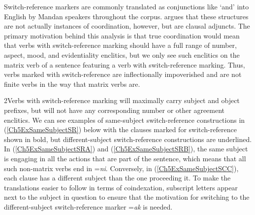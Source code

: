 Switch-reference markers are commonly translated as conjunctions like `and' into English by Mandan speakers throughout the corpus. \citet{kasak2019} argues that these structures are not actually instances of coordination, however, but are clausal adjuncts. The primary motivation behind this analysis is that true coordination would mean that verbs with switch-reference marking should have a full range of number, aspect, mood, and evidentiality enclitics, but we only see such enclitics on the matrix verb of a sentence featuring a verb with switch-reference marking. Thus, verbs marked with switch-reference are inflectionally impoverished and are not finite verbs in the way that matrix verbs are. 

2Verbs with switch-reference marking will maximally carry subject and object prefixes, but will not have any corresponding number or other agreement enclitics. We can see examples of same-subject switch-reference constructions in (\ref{Ch5ExSameSubjectSR}) below with the clauses marked for switch-reference shown in bold, but different-subject switch-reference constructions are underlined. In (\ref{Ch5ExSameSubjectSRA}) and (\ref{Ch5ExSameSubjectSRB}), the same subject is engaging in all the actions that are part of the sentence, which means that all such non-matrix verbs end in =\textit{ni}. Conversely, in (\ref{Ch5ExSameSubjectSCC}), each clause has a different subject than the one proceeding it. To make the translations easier to follow in terms of coindexation, subscript letters appear next to the subject in question to ensure that the motivation for switching to the different-subject switch-reference marker =\textit{ak} is needed.

